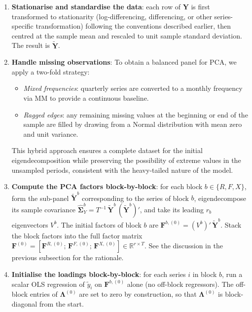 \documentclass[11pt, a4paper, oneside]{article}
\newcommand{\mY}{\mathbf{Y}}
\begin{document}
\begin{enumerate}[leftmargin=1.5em, itemsep=3pt]
    \item \textbf{Stationarise and standardise the data}: each row of $\mY$
      is first transformed to stationarity (log-differencing,
      differencing, or other series-specific transformation) following
      the conventions described earlier, then centred at the sample
      mean and rescaled to unit sample standard deviation. The result
      is $\tilde{\mY}$.
    \item \textbf{Handle missing observations}: To obtain a balanced panel for PCA, we apply a two-fold strategy:
    \begin{itemize}
        \item \textit{Mixed frequencies}: quarterly series are converted to a monthly frequency via MM to provide a continuous baseline.
        \item \textit{Ragged edges}: any remaining missing values at the beginning or end of the sample are filled by drawing from a Normal distribution with mean zero and unit variance. 
    \end{itemize}
    This hybrid approach ensures a complete dataset for the initial eigendecomposition while preserving the possibility of extreme values in the unsampled periods, consistent with the heavy-tailed nature of the model.
    \item \textbf{Compute the PCA factors block-by-block}: for each
          block $b \in \{R, F, X\}$, form the sub-panel
          $\tilde{\mY}^b$ corresponding to the series of block $b$,
          eigendecompose its sample covariance
          $\widehat{\boldsymbol{\Sigma}}^b_Y = T^{-1}\,\tilde{\mY}^b\,(\tilde{\mY}^b)'$,
          and take its leading $r_b$ eigenvectors $V^b$. The initial
          factors of block $b$ are $\mathbf{F}^{b,(0)} = (V^b)'\,\tilde{\mY}^b$.
          Stack the block factors into the full factor matrix
          $\mathbf{F}^{(0)} = [\mathbf{F}^{R,(0)};\, \mathbf{F}^{F,(0)};\, \mathbf{F}^{X,(0)}] \in \mathbb{R}^{r \times T}$.
          See the discussion in the previous subsection for the rationale.
    \item \textbf{Initialise the loadings block-by-block}: for each
          series $i$ in block $b$, run a scalar OLS regression of
          $\tilde{y}_i$ on $\mathbf{F}^{b,(0)}$ alone (no off-block
          regressors). The off-block entries of $\boldsymbol{\Lambda}^{(0)}$
          are set to zero by construction, so that $\boldsymbol{\Lambda}^{(0)}$
          is block-diagonal from the start.

\end{enumerate}
\end{document}
